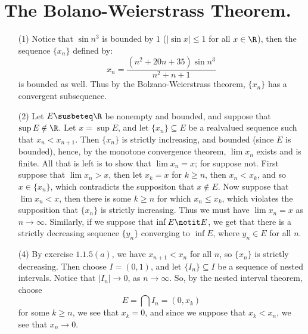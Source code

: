 
\section{The Bolano-Weierstrass Theorem.}

\begin{enumerate}[label=(\arabic*)]
    \item[(1)] Notice that $\sin{n^3}$ is bounded by  $1$  ($|\sin{x}| \leq 1$ 
    for all $x \in \R$), then the sequence $\{x_n\}$ defined by:
        \begin{equation*}
            x_n=\frac{(n^2+20n+35)\sin{n^3}}{n^2+n+1}
        \end{equation*}
    is bounded as well. Thus by the Bolzano-Weierstrass theorem, $\{x_n\}$ has 
    a convergent subsequence.

    \item[(2)] Let $E \susbeteq \R$ be nonempty and bounded, and suppose that  
        $\sup{E} \notin \R$. Let $x=\sup{E}$, and let  $\{x_n\} \subseteq E$ be a realvalued 
        sequence such that  $x_n<x_{n+1}$. Then  $\{x_n\}$ is strictly inclreasing, 
        and bounded  (since $E$ is bounded), hence, by the monotone convergence 
        theorem, $\lim{x_n}$ exists and is finite. All that is left is to show 
        that  $\lim{x_n}=x$; for suppose not. First suppose that $\lim{x_n}>x$, 
        then let $x_k=x$ for  $k \geq n$, then  $x_n < x_k$, and so  $x \in \{x_n\}$, 
        which contradicts the suppositon that  $x \notin E$. Now suppose that  
        $\lim{x_n}<x$, then there is some  $k \geq n$ for which $x_n \leq x_k$, which 
        violates the supposition that  $\{x_n\}$ is strictly increasing. Thus we 
        must have $\lim{x_n}=x$ as  $n \rightarrow \infty$. Similarly, if we suppose that 
        $\inf{E} \notit E$, we get that there is a strictly decreasing sequence 
        $\{y_n\}$ converging to  $\inf{E}$, where  $y_n \in E$ for all  $n$.

    \item[(4)] By exercise  $1.1.5(a)$, we have  $x_{n+1}<x_n$ for all  $n$, so 
        $\{x_n\}$ is strictly decreasing. Then choose  $I=(0,1)$, and let  
        $\{I_n\} \subseteq I$ be a sequence of nested intervals. Notice that $|I_n| \rightarrow 0$, 
        as $n \rightarrow \infty$. So, by the nested interval theorem, choose 
            \begin{equation*}
                E=\bigcap{I_n}=(0,x_k)
            \end{equation*}
        for some $k \geq n$, we see that $x_k=0$, and since we suppose that $x_k<x_n$, 
        we see that  $x_n \rightarrow 0$.


\end{enumerate}
